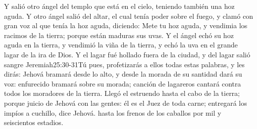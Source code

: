 Y salió otro ángel del templo que está en el cielo, teniendo también una hoz aguda. 
Y otro ángel salió del altar, el cual tenía poder sobre el fuego, y clamó con gran voz al que tenía la hoz aguda, diciendo: Mete tu hoz aguda, y vendimia los racimos de la tierra; porque están maduras sus uvas. 
Y el ángel echó su hoz aguda en la tierra, y vendimió la viña de la tierra, y echó la uva en el grande lagar de la ira de Dios.
Y el lagar fué hollado fuera de la ciudad, y del lagar salió sangre%
				{Jeremiah}{25:30-31}{Tú pues, profetizarás a ellos todas estas palabras, y les dirás: Jehová bramará desde lo alto, y desde la morada de su santidad dará su voz: enfurecido bramará sobre su morada; canción de lagareros cantará contra todos los moradores de la tierra. Llegó el estruendo hasta el cabo de la tierra; porque juicio de Jehová con las gentes: él es el Juez de toda carne; entregará los impíos a cuchillo, dice Jehová.}
 hasta los frenos de los caballos por mil y seiscientos estadios.

